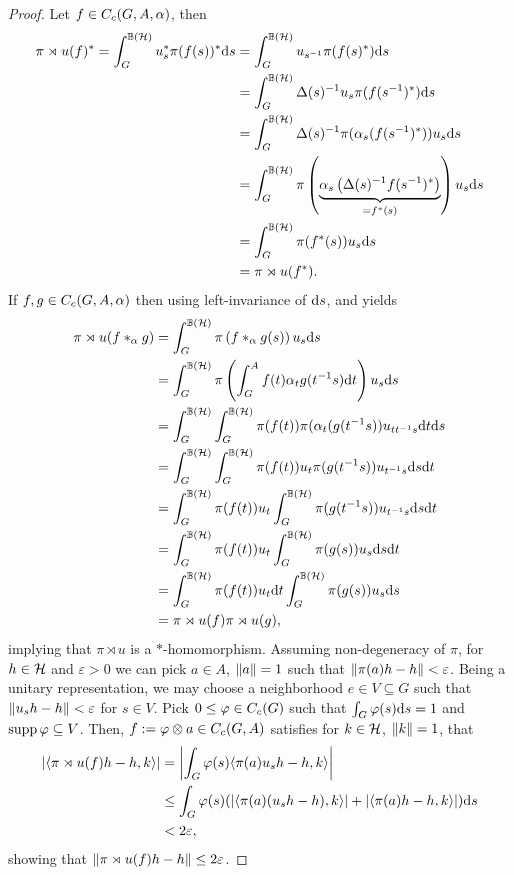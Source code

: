 \begin{proof}
Let $f \in C_c(G,A,\alpha)$, then
\begin{align*}
	\pi \rtimes u(f)^* = \int_G^{\mathbb{B}(\mathcal{H})}  u_s^* \pi(f(s))^* \mathrm{d} s &= \int_G^{\mathbb{B}(\mathcal{H})} u_{s^{-1}} \pi(f(s)^*) \mathrm{d} s\\
	&= \int_G^{\mathbb{B}(\mathcal{H})} \Delta(s)^{-1} u_{s} \pi(f(s^{-1})^*) \mathrm{d} s \\
	&= \int_G^{\mathbb{B}(\mathcal{H})} \Delta(s)^{-1} \pi(\alpha_s(f(s^{-1})^*)) u_s \mathrm{d} s\\
	&= \int_G^{\mathbb{B}(\mathcal{H})} \pi\left( \underbrace{\alpha_s\left( \Delta(s)^{-1}f(s^{-1})^* \right)}_{=f^*(s)} \right) u_s \mathrm{d} s\\
	&= \int_G^{\mathbb{B}(\mathcal{H})} \pi(f^*(s)) u_s \mathrm{d} s\\
	&= \pi \rtimes u(f^*).
\end{align*}
If $f,g \in C_c(G,A,\alpha)$ then using left-invariance of $\mathrm{d} s$,  and  yields
\begin{align*}
	\pi \rtimes u(f\ast_{\alpha}g) &= \int_G^{\mathbb{B}(\mathcal{H})} \pi \left( f \ast_\alpha g(s) \right)u_s \mathrm{d} s\\
	&= \int_G^{\mathbb{B}(\mathcal{H})} \pi\left( \int_G^A f(t) \alpha_t g(t^{-1}s) \mathrm{d} t \right)u_s \mathrm{d} s\\
	&= \int_G^{\mathbb{B}(\mathcal{H})}\int_G^{\mathbb{B}(\mathcal{H})} \pi(f(t)) \pi(\alpha_t(g(t^{-1}s))u_{t t^{-1}s} \mathrm{d} t \mathrm{d} s\\
	&= \int_G^{\mathbb{B}(\mathcal{H})} \int_G ^{\mathbb{B}(\mathcal{H})} \pi(f(t)) u_t \pi(g(t^{-1}s)) u_{t^{-1}s}\mathrm{d} s \mathrm{d} t\\
	&= \int_G^{\mathbb{B}(\mathcal{H})} \pi(f(t)) u_t \int_G^{\mathbb{B}(\mathcal{H})} \pi(g(t^{-1}s )) u_{t^{-1}s} \mathrm{d} s \mathrm{d} t\\
	&= \int_G ^{\mathbb{B}(\mathcal{H})} \pi(f(t)) u_t \int_G ^{\mathbb{B}(\mathcal{H})} \pi(g(s)) u_s \mathrm{d} s \mathrm{d} t\\
	&= \int_G ^{\mathbb{B}(\mathcal{H})} \pi(f(t)) u_t \mathrm{d} t \int_G ^{\mathbb{B}(\mathcal{H})} \pi(g(s)) u_s \mathrm{d} s \\
	&= \pi \rtimes u (f) \pi\rtimes u (g),
\end{align*}
implying that $\pi \rtimes u$ is a $*$-homomorphism. Assuming non-degeneracy of $\pi$, for $h \in \mathcal{H}$ and $\varepsilon>0$ we can pick $a \in A$, $\left\lVert a \right\rVert =1$ such that $\left\lVert \pi(a) h - h \right\rVert < \varepsilon$. Being a unitary representation, we may choose a neighborhood $e \in V \subseteq G$ such that $\left\lVert u_s h - h\right\rVert < \varepsilon$ for $s \in V$. Pick $0 \leq \varphi \in C_c(G)$ such that $\int_G \varphi(s) \mathrm{d} s = 1$ and $\operatorname{supp} \varphi \subseteq V$. Then, $f := \varphi \otimes a \in C_c(G,A)$ satisfies for $k \in \mathcal{H}$, $\left\lVert k \right\rVert = 1$, that
\begin{align*}
\left| \langle \pi \rtimes u(f)h-h,k\rangle \right| &= 	\left| \int_G \varphi(s) \langle \pi(a)u_s h-h,k \rangle\right|\\
& \leq \int_G \varphi(s) (|\langle \pi(a) (u_s h-h),k\rangle|+|\langle \pi(a)h-h,k\rangle| ) \mathrm{d} s \\
&< 2 \varepsilon,
\end{align*}
showing that $\left\lVert \pi \rtimes u(f)h-h\right\rVert \leq 2 \varepsilon$.
\end{proof}

